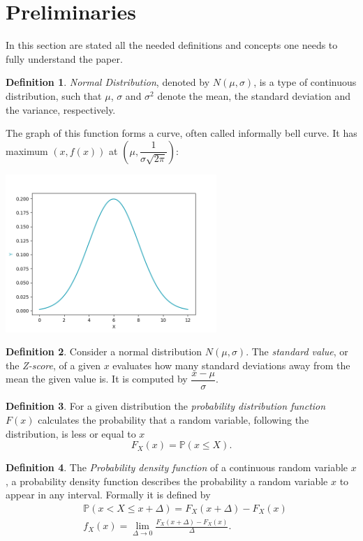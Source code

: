 \documentclass[11pt, a4paper]{article}
\theoremstyle{definition}
\newtheorem{definition}{Definition}
\begin{document}
	\section{Preliminaries}
	In this section are stated all the needed definitions and concepts one needs to fully understand the paper.
		\begin{definition}
			\label{def:normdist}
			\emph{Normal Distribution}, denoted by $N(\mu, \sigma)$, is a type of continuous distribution, such that $\mu$, $\sigma$ and $\sigma^{2}$ denote the mean, the standard deviation and the variance, respectively.
		\end{definition}
	
		The graph of this function forms a curve, often called informally bell curve. It has maximum $(x,f(x))$ at $\left(\mu, \dfrac{1}{\sigma\sqrt{2\pi}}\right)$:
		\begin{center}
			\includegraphics[width=0.6\textwidth]{Normal_clean}
		\end{center}
		
		\begin{definition}
			\label{def:def2}
			Consider a normal distribution $N(\mu, \sigma)$. The \emph{standard value}, or the \emph{Z-score}, of a given $x$ evaluates how many standard deviations away from the mean the given value is. It is computed by $\dfrac{x-\mu}{\sigma}$.
		\end{definition}
	
		\begin{definition}
			\label{def:prob_dist}
			For a given distribution the \emph{probability distribution function} $F(x)$ calculates the probability that a random variable, following the distribution, is less or equal to $x$
			$$F_{X}(x)=\mathbb{P}(x\leq X).$$
		\end{definition}
	
		\begin{definition}
			\label{def:prob_dens}
			The \emph{Probability density function} of a continuous random variable $x$, a probability density function describes the probability a random variable $x$ to appear in any interval. Formally it is defined by
			\begin{align*}
				&\mathbb{P}(x < X \leq x+\Delta)=F_X(x+\Delta)-F_X(x)\\
				&f_X(x)=\lim_{\Delta \rightarrow 0} \frac{F_X(x+\Delta)-F_X(x)}{\Delta}.		
			\end{align*}
		\end{definition}
	
\end{document}
